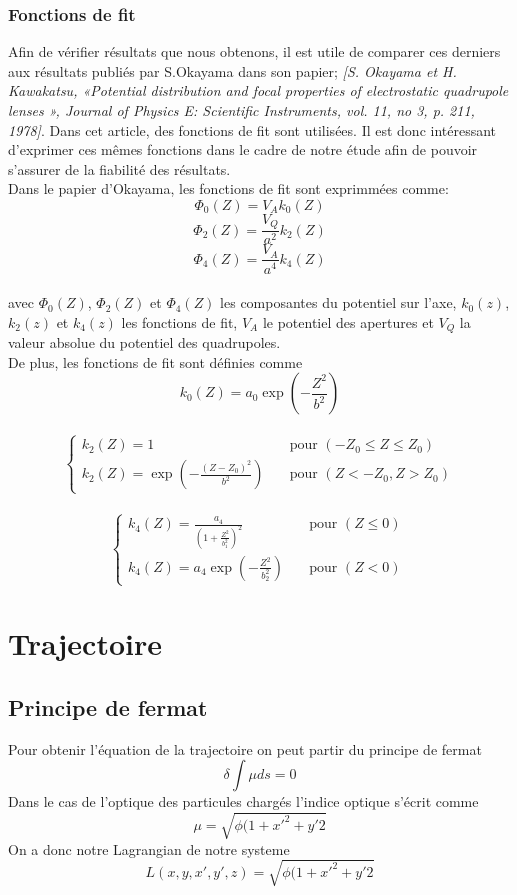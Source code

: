 \documentclass{report}
\begin{document}
\subsubsection{Fonctions de fit}
Afin de vérifier résultats que nous obtenons, il est utile de comparer ces derniers aux résultats publiés par S.Okayama dans son papier;
\textit{[S. Okayama et H. Kawakatsu, «Potential distribution and focal properties of electrostatic quadrupole lenses », 
Journal of Physics E: Scientific Instruments, vol. 11, no 3, p. 211, 1978]}. Dans cet article, des fonctions de 
fit sont utilisées. Il est donc intéressant d'exprimer ces mêmes fonctions dans le cadre de notre étude 
afin de pouvoir s'assurer de la fiabilité des résultats. 
\
\\
Dans le papier d'Okayama, les fonctions de fit sont exprimmées comme:
\
\\
\[
\Phi_0(Z)=V_A k_0 (Z) 
\]
\[ 
\Phi_2(Z)=\frac{V_Q}{a^2} k_2 (Z) 
\]
\[
\Phi_4(Z)=\frac{V_A}{a^4} k_4 (Z)
\]
\
\\
avec $\Phi_0(Z)$, $\Phi_2(Z)$ et $\Phi_4(Z)$ les composantes du potentiel sur l'axe, $k_0(z)$, $k_2(z)$ et $k_4(z)$
les fonctions de fit, $V_A$ le potentiel des apertures et $V_Q$ la valeur absolue du potentiel des quadrupoles. 
\\
De plus, les fonctions de fit sont définies comme 
\
\\

\[
k_0 (Z)=a_0 \exp{\left(- \frac{Z^2}{b^2}\right)}
\]
\
\\
\[
\left\{
  \begin{array} {ll}
    k_2 (Z)=1 \quad & \mbox{pour } (-Z_0\leq Z\leq Z_0)
    \
    \\
    k_2 (Z)=\exp{\left(- \frac{(Z-Z_0)^2}{b^2}\right)} \quad & \mbox{pour } (Z<-Z_0, Z>Z_0)
  \end{array}
\right.
\]
\
\\
\[
\left\{
  \begin{array} {ll}
    k_4 (Z)=\frac{a_4}{\left(1+\frac{Z^2}{b_1 ^2}\right)^2} \quad & \mbox{pour } (Z\leq 0)
    \
    \\
    k_4 (Z)=a_4 \exp{\left(- \frac{Z^2}{b_2 ^2}\right)} \quad & \mbox{pour } (Z < 0)
  \end{array}
\right.
\]

\section{Trajectoire}

\subsection{Principe de fermat}
Pour obtenir l'équation de la trajectoire on peut partir du principe de fermat 
\[
\delta \int \mu ds = 0
\]
Dans le cas de l'optique des particules chargés l'indice optique s'écrit comme 
\[
\mu = \sqrt{\phi(1+x'^2 + y'2}
\]
On a donc notre Lagrangian de notre systeme 
\[
L(x,y,x',y',z)= \sqrt{{\phi(1+x'^2 + y'2}}
\]
\end{document}

